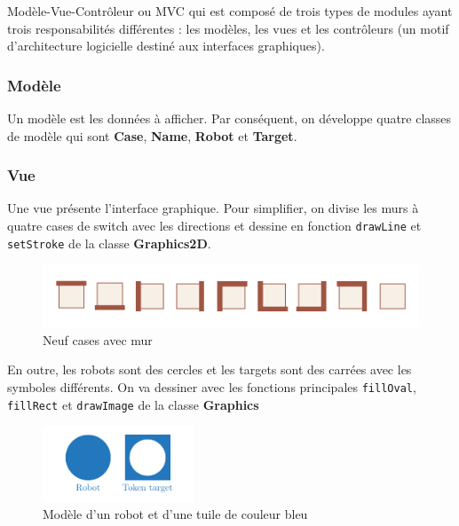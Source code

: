 \documentclass[12pt, pdflatex]{article}
\begin{document}
    Modèle-Vue-Contrôleur ou MVC\cite{mvc} qui est composé de trois types de modules ayant trois responsabilités différentes : les modèles, les vues et les contrôleurs (un motif d'architecture logicielle destiné aux interfaces graphiques).

        \subsubsection{Modèle}
        Un modèle est les données à afficher. Par conséquent, on développe quatre classes de modèle qui sont \textbf{Case}, \textbf{Name}, \textbf{Robot} et \textbf{Target}.

        \subsubsection{Vue}
        Une vue présente l'interface graphique. Pour simplifier, on divise les murs à quatre cases de switch avec les directions et dessine en fonction \texttt{drawLine} et \texttt{setStroke} de la classe \textbf{Graphics2D}.

        \begin{figure}[H]
            \centering
            \includegraphics[width=1\textwidth]{sources/cases.pdf}
            \caption{Neuf cases avec mur}
        \end{figure}

        En outre, les robots sont des cercles et les targets sont des carrées avec les symboles différents. On va dessiner avec les fonctions principales \texttt{fillOval}, \texttt{fillRect} et \texttt{drawImage} de la classe \textbf{Graphics}

        \begin{figure}[H]
            \centering
            \includegraphics[width=0.4\textwidth]{sources/graphic-1.pdf}
            \caption{Modèle d'un robot et d'une tuile de couleur bleu}
        \end{figure}
\end{document}
